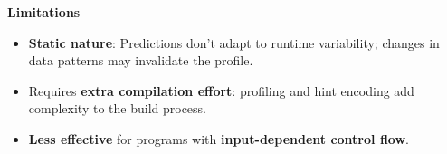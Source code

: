 \highspace
\begin{flushleft}
  \textcolor{Red2}{ \textbf{Limitations}}
\end{flushleft}
\begin{itemize}[label=\textcolor{Red2}{}]
  \item \textbf{Static nature}: Predictions don't adapt to runtime variability; changes in data patterns may invalidate the profile.
  \item Requires \textbf{extra compilation effort}: profiling and hint encoding add complexity to the build process.
  \item \textbf{Less effective} for programs with \textbf{input-dependent control flow}.
\end{itemize}
